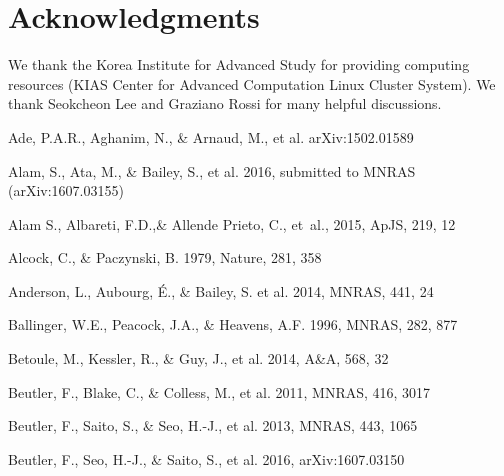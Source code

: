 \documentclass[useAMS,usenatbib]{mnras}
\begin{document}
\section*{Acknowledgments}

We thank the Korea Institute for Advanced Study for providing computing resources (KIAS Center for Advanced Computation Linux Cluster System).
We thank Seokcheon Lee and Graziano Rossi for many helpful discussions.


\begin{thebibliography}{}


Ade, P.A.R., Aghanim, N., \& Arnaud, M., et al. arXiv:1502.01589

Alam, S., Ata, M., \& Bailey, S., et al. 2016,
submitted to MNRAS (arXiv:1607.03155)

{Alam} S., Albareti, F.D.,\& Allende Prieto, C., {et~al.}, 2015,  ApJS, 219, 12

Alcock, C., \& Paczynski, B. 1979, Nature, 281, 358  


Anderson, L., Aubourg, \'E., \& Bailey, S. et al. 2014, MNRAS, 441, 24  
  

Ballinger, W.E., Peacock, J.A., \& Heavens, A.F. 1996, MNRAS, 282, 877  

Betoule, M., Kessler, R., \& Guy, J., et al. 2014, A\&A, 568, 32


Beutler, F., Blake, C., \& Colless, M., et al. 2011, MNRAS, 416, 3017

Beutler, F., Saito, S., \& Seo, H.-J., et al. 2013, MNRAS, 443, 1065

Beutler, F., Seo, H.-J., \& Saito, S., et al. 2016,
arXiv:1607.03150


\end{thebibliography}
\end{document}
